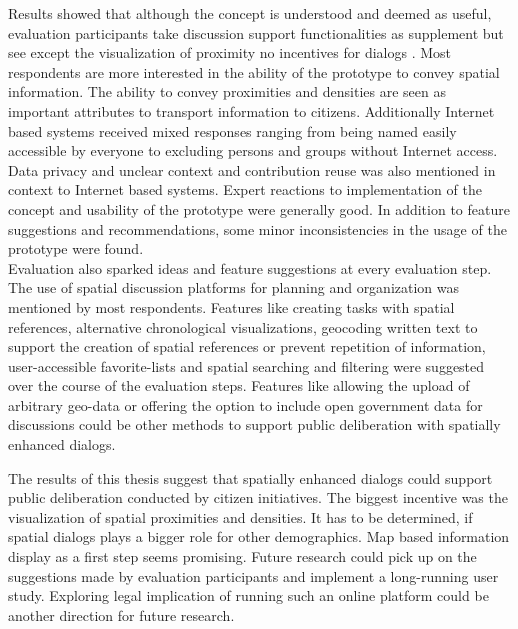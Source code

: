 Results showed that although the concept is understood and deemed as useful, evaluation participants take discussion support functionalities as supplement but see except the visualization of proximity no incentives for dialogs . Most respondents are more interested in the ability of the prototype to convey spatial information. The ability to convey proximities and densities are seen as important attributes to transport information to citizens. Additionally Internet based systems received mixed responses ranging from being named easily accessible by everyone to excluding persons and groups without Internet access. Data privacy and unclear context and contribution reuse was also mentioned in context to Internet based systems. Expert reactions to implementation of the concept and usability of the prototype were generally good. In addition to feature suggestions and recommendations, some minor inconsistencies in the usage of the prototype were found.\\
Evaluation also sparked ideas and feature suggestions at every evaluation step. The use of spatial discussion platforms for planning and organization was mentioned by most respondents. Features like creating tasks with spatial references, alternative chronological visualizations, geocoding written text to support the creation of spatial references or prevent repetition of information, user-accessible favorite-lists and spatial searching and filtering were suggested over the course of the evaluation steps. Features like allowing the upload of arbitrary geo-data or offering the option to include open government data for discussions could be other methods to support public deliberation with spatially enhanced dialogs.


The results of this thesis suggest that spatially enhanced dialogs could support public deliberation conducted by citizen initiatives. The biggest incentive was the visualization of spatial proximities and densities. It has to be determined, if spatial dialogs plays a bigger role for other demographics. Map based information display as a first step seems promising. Future research could pick up on the suggestions made by evaluation participants and implement a long-running user study. Exploring legal implication of running such an online platform could be another direction for future research.
